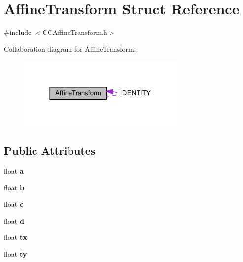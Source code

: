 \hypertarget{structAffineTransform}{}\section{Affine\+Transform Struct Reference}
\label{structAffineTransform}


{\ttfamily \#include $<$C\+C\+Affine\+Transform.\+h$>$}



Collaboration diagram for Affine\+Transform\+:
\nopagebreak
\begin{figure}[H]
\begin{center}
\leavevmode
\includegraphics[width=234pt]{structAffineTransform__coll__graph}
\end{center}
\end{figure}
\subsection*{Public Attributes}
\begin{DoxyCompactItemize}
\item 
\mbox{\label{structAffineTransform_a6c5bf3e066961d7a6e3876549e378bee}} 
float {\bfseries a}
\item 
\mbox{\label{structAffineTransform_aa65b795bd3a7ffe65d9f2faa710a0189}} 
float {\bfseries b}
\item 
\mbox{\label{structAffineTransform_a3c0dc7f44df0ac0116a8ba316b2253c2}} 
float {\bfseries c}
\item 
\mbox{\label{structAffineTransform_a1540273b7c1e4da3a5229eaf36b0dda0}} 
float {\bfseries d}
\item 
\mbox{\label{structAffineTransform_a1016ca98db82fe05eb784462f9186260}} 
float {\bfseries tx}
\item 
\mbox{\label{structAffineTransform_a90ff6ca3c75a087dbb44846eff8decfd}} 
float {\bfseries ty}
\end{DoxyCompactItemize}
